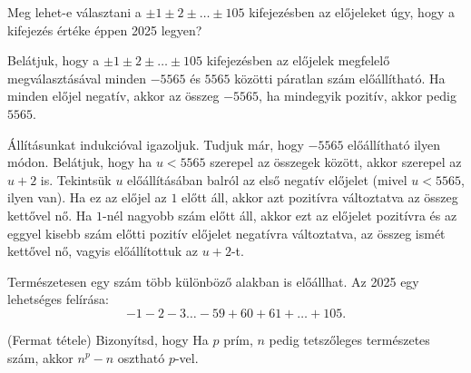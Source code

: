 \begin{solution}
\begin{center}
\begin{minipage}[c]{0.45\textwidth}
\end{minipage}
\par\end{center}
\end{solution}
\begin{problem}
Meg lehet-e választani a $\pm1\pm2\pm\dots\pm105$ kifejezésben az
előjeleket úgy, hogy a kifejezés értéke éppen 2025 legyen? 
\end{problem}

\begin{solution}
Belátjuk, hogy a $\pm1\pm2\pm\dots\pm105$ kifejezésben az előjelek
megfelelő megválasztásával minden $-5565$ és $5565$ közötti páratlan
szám előállítható. Ha minden előjel negatív, akkor az összeg $-5565$,
ha mindegyik pozitív, akkor pedig $5565$.

Állításunkat indukcióval igazoljuk. Tudjuk már, hogy $-5565$ előállítható
ilyen módon. Belátjuk, hogy ha $u<5565$ szerepel az összegek között,
akkor szerepel az $u+2$ is. Tekintsük $u$ előállításában balról
az első negatív előjelet (mivel $u<5565$, ilyen van). Ha ez az előjel
az $1$ előtt áll, akkor azt pozitívra változtatva az összeg kettővel
nő. Ha $1$-nél nagyobb szám előtt áll, akkor ezt az előjelet pozitívra
és az eggyel kisebb szám előtti pozitív előjelet negatívra változtatva,
az összeg ismét kettővel nő, vagyis előállítottuk az $u+2$-t.

Természetesen egy szám több különböző alakban is előállhat. Az 2025
egy lehetséges felírása: 
\[
-1-2-3\dots-59+60+61+\dots+105.
\]
\end{solution}
\begin{problem}
(Fermat tétele) Bizonyítsd, hogy Ha $p$ prím, $n$ pedig tetszőleges
természetes szám, akkor $n^{p}-n$ osztható $p$-vel.
\end{problem}

